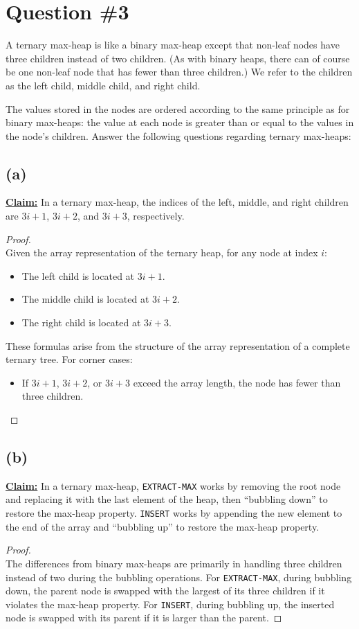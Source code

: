 \documentclass[12pt]{article}
\begin{document}
\section*{Question \#3}
A ternary max-heap is like a binary max-heap except that non-leaf nodes have three children instead of two children. (As with binary heaps, there can of course be one non-leaf node that has fewer than three children.) We refer to the children as the left child, middle child, and right child.

The values stored in the nodes are ordered according to the same principle as for binary max-heaps: the value at each node is greater than or equal to the values in the node’s children. Answer the following questions regarding ternary max-heaps:

\subsection*{(a)}
\textbf{\underline{Claim:}} In a ternary max-heap, the indices of the left, middle, and right children are \(3i + 1\), \(3i + 2\), and \(3i + 3\), respectively.
\begin{proof}
\leavevmode\\
Given the array representation of the ternary heap, for any node at index \(i\):
\begin{itemize}
    \item The left child is located at \(3i + 1\).
    \item The middle child is located at \(3i + 2\).
    \item The right child is located at \(3i + 3\).
\end{itemize}
These formulas arise from the structure of the array representation of a complete ternary tree. For corner cases:
\begin{itemize}
    \item If \(3i + 1\), \(3i + 2\), or \(3i + 3\) exceed the array length, the node has fewer than three children.
\end{itemize}
\end{proof}

\subsection*{(b)}
\textbf{\underline{Claim:}} In a ternary max-heap, \texttt{EXTRACT-MAX} works by removing the root node and replacing it with the last element of the heap, then “bubbling down” to restore the max-heap property. \texttt{INSERT} works by appending the new element to the end of the array and “bubbling up” to restore the max-heap property.
\begin{proof}
\leavevmode\\
The differences from binary max-heaps are primarily in handling three children instead of two during the bubbling operations. For \texttt{EXTRACT-MAX}, during bubbling down, the parent node is swapped with the largest of its three children if it violates the max-heap property. For \texttt{INSERT}, during bubbling up, the inserted node is swapped with its parent if it is larger than the parent.
\end{proof}
\end{document}
